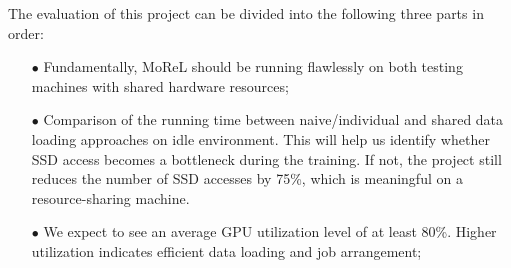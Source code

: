 \documentclass[conference]{IEEEtran}
\begin{document}
The evaluation of this project can be divided into the following three parts in order:
\begin{itemize}
	\item[$\bullet$]  Fundamentally, MoReL should be running flawlessly on both testing machines with shared hardware resources;
	\item[$\bullet$]  Comparison of the running time between naive/individual and shared data loading approaches on idle environment. 
		This will help us identify whether SSD access becomes a bottleneck during the training. 
		If not, the project still reduces the number of SSD accesses by 75\%, which is meaningful on a resource-sharing machine. 
	\item[$\bullet$]  We expect to see an average GPU utilization level of at least 80\%. 
		Higher utilization indicates efficient data loading and job arrangement;
\end{itemize}
\end{document}
